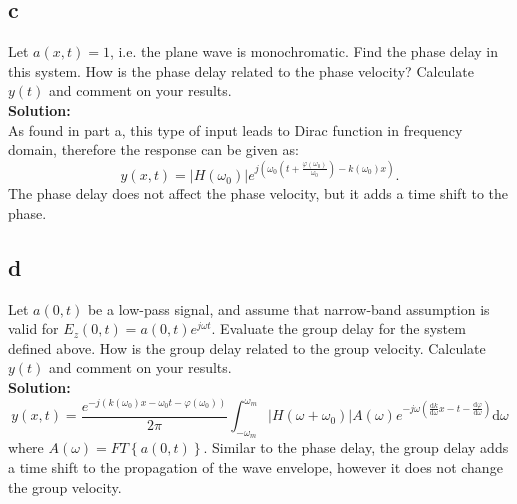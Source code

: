 \documentclass[11pt]{amsart}
\begin{document}
\subsection*{c}

Let $a(x,t)=1$, i.e. the plane wave is monochromatic. Find the phase delay in this system.
How is the phase delay related to the phase velocity? Calculate $y(t)$ and comment on your
results.
\\
\textbf{Solution:}\\
As found in part a, this type of input leads to Dirac function in frequency domain, therefore the response can be given as: 
\begin{equation}
y(x,t)=\left | H(\omega_0) \right | e^{j  (\omega_0( t + \frac{\varphi(\omega_0)}{\omega_0} )-k(\omega_0)x)}.
\end{equation}
The phase delay does not affect the phase velocity, but it adds a time shift to the phase.
\subsection*{d}
Let $a(0,t)$ be a low-pass signal, and assume that narrow-band assumption is valid for $E_z(0,t)=a(0,t)e^{j \omega t}$. Evaluate the group delay for the system defined above. How is the
group delay related to the group velocity. Calculate $y(t)$ and comment on your results.
\\
\textbf{Solution:}\\
\begin{equation}
\label{int:1}
y(x,t)=\frac{e^{-j(k(\omega_0) x-\omega_0 t-\varphi(\omega_0))}}{2 \pi} \int_{-\omega_m}^{\omega_m}\left | H(\omega+\omega_0) \right | A(\omega) e^{-j \omega(\frac{\mathrm{d}k }{\mathrm{d} \omega} x - t- \frac{\mathrm{d}\varphi }{\mathrm{d} \omega})} \mathrm{d} \omega
\end{equation}
where $A(\omega)=FT\left \{  a(0,t) \right \}$. Similar to the phase delay, the group delay adds a time shift to the propagation of the wave envelope, however it does not change the group velocity. 
\end{document}
